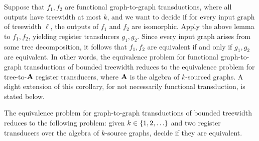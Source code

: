 Suppose that  $f_1,f_2$ are functional graph-to-graph \mso transductions, where all outputs have treewidth at most $k$,  and we want to decide if for every input graph of treewidth $\ell$, the outputs of $f_1$ and $f_2$ are isomorphic. Apply the above lemma to $f_1,f_2$, yielding register transducers $g_1,g_2$. Since every input graph arises from some tree decomposition, it follows that $f_1,f_2$ are equivalent if and only if $g_1,g_2$ are equivalent. In other words,  the  equivalence problem for functional graph-to-graph \mso transductions of bounded treewidth reduces to the equivalence problem for tree-to-$\mathbf{A}$ register transducers, where $\mathbf{A}$ is the algebra of $k$-sourced graphs. A slight extension of this corollary, for not necessarily functional transduction, is stated below.

\begin{corollary}\label{cor:reduce-to-transducers} The equivalence problem for graph-to-graph \mso transductions of bounded treewidth reduces to the following problem: given $k \in \{1,2,\ldots\}$ and two register transducers over the algebra of $k$-source graphs, decide if they are equivalent. 
\end{corollary}